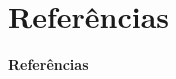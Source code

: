 \documentclass[serif,10pt]{beamer}
\begin{document}
\section{Referências}

\begin{frame}[allowframebreaks]{{\bf \color{blue} Referências}}
\nocite{*}


\end{frame}

\end{document}
